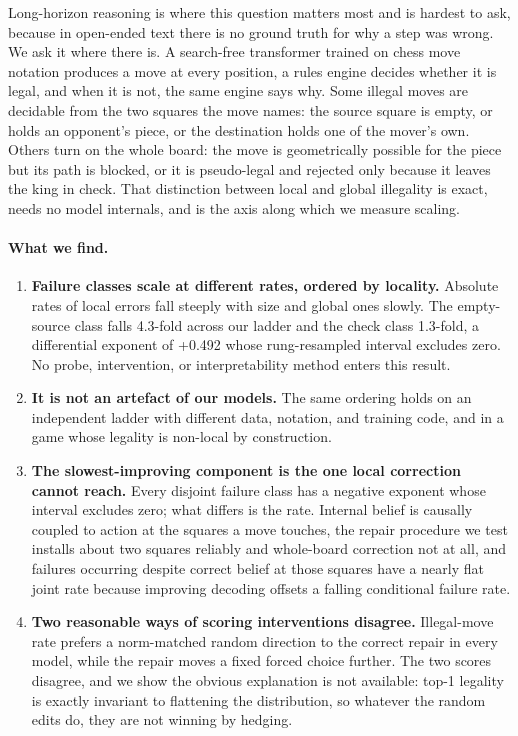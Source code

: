 \documentclass[11pt]{article}
\begin{document}
Long-horizon reasoning is where this question matters most and is hardest to ask,
because in open-ended text there is no ground truth for why a step was wrong. We
ask it where there is. A search-free transformer trained on chess move notation
produces a move at every position, a rules engine decides whether it is legal,
and when it is not, the same engine says why. Some illegal moves are decidable
from the two squares the move names: the source square is empty, or holds an
opponent's piece, or the destination holds one of the mover's own. Others turn on
the whole board: the move is geometrically possible for the piece but its path is
blocked, or it is pseudo-legal and rejected only because it leaves the king in
check. That distinction between local and global illegality is exact, needs no
model internals, and is the axis along which we measure scaling.

\paragraph{What we find.}
\begin{enumerate}[nosep]
\item \textbf{Failure classes scale at different rates, ordered by locality.}
Absolute rates of local errors fall steeply with size and global ones slowly. The
empty-source class falls 4.3-fold across our ladder and the check class
1.3-fold, a differential exponent of +0.492 whose rung-resampled
interval excludes zero. No probe,
intervention, or interpretability method enters this result.
\item \textbf{It is not an artefact of our models.} The same ordering holds on an
independent ladder with different data, notation, and training code, and in a
game whose legality is non-local by construction.
\item \textbf{The slowest-improving component is the one local correction cannot
reach.} Every disjoint failure class has a negative exponent whose interval excludes zero;
what differs is the rate.
Internal belief is causally coupled to action at the squares a move touches, the
repair procedure we test installs about two squares reliably and whole-board
correction not at all, and failures occurring despite correct belief at those squares
have a nearly flat joint rate because improving decoding offsets a falling
conditional failure rate.
\item \textbf{Two reasonable ways of scoring interventions disagree.}
Illegal-move rate prefers a norm-matched random direction to the correct repair in
every model, while the repair moves a fixed forced choice further. The two scores
disagree, and we show the obvious explanation is not available: top-1 legality is
exactly invariant to flattening the distribution, so whatever the random edits do,
they are not winning by hedging.
\end{enumerate}
\end{document}
